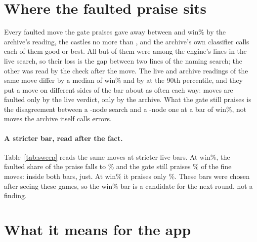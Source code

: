 \documentclass[11pt]{article}
\begin{document}
\section{Where the faulted praise sits}

Every faulted move the gate praises gave away between \FaultedRangeLow{} and
\FaultedRangeHigh{} win\% by the archive's reading, the castles no more than \CastleRangeHigh,
and the archive's own classifier calls each of them good or best. All but
\FaultedPraisedOutOfLines{} of them were among the engine's \Lines{} lines in the live search, so
their loss is the gap between two lines of the naming search; the other was read by the check
after the move. The live and archive readings of the same move differ by a median of \GapMedian{} win\% and
by \GapNinety{} at the 90th percentile, and they put a move on different sides of the bar about
as often each way: \LiveOnly{} moves are faulted only by the live verdict, \ArchiveOnly{} only by
the archive. What the gate still praises is the disagreement between a \NamingNodes-node search
and a \ArchiveNodes-node one at a bar of \PraiseBar{} win\%, not moves the archive itself calls errors.

\SweepTable

\paragraph{A stricter bar, read after the fact.} Table~\ref{tab:sweep} reads the same moves at
stricter live bars. At \CandidateBar{} win\%, the faulted share of the praise falls to
\OneFaultedPct\% and the gate still praises \OneFinePct\% of the fine moves: inside both bars, just.
At \StrictBar{} win\% it praises only \HalfFinePct\%. These bars were chosen after seeing these games, so
the \CandidateBar{} win\% bar is a candidate for the next round, not a finding.

\section{What it means for the app}
\end{document}
